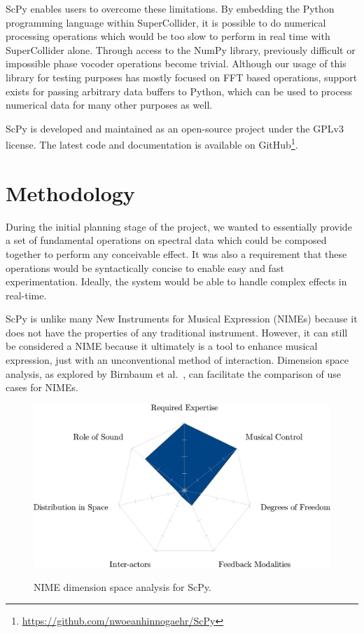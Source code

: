 \documentclass{article}
\begin{document}
ScPy enables users to overcome these limitations. By embedding the Python programming language
within SuperCollider, it is possible to do numerical processing operations which would be too slow
to perform in real time with SuperCollider alone. Through access to the NumPy library, previously
difficult or impossible phase vocoder operations become trivial. Although our usage of this library
for testing purposes has mostly focused on FFT based operations, support exists for passing
arbitrary data buffers to Python, which can be used to process numerical data for many other
purposes as well.

ScPy is developed and maintained as an open-source project under the GPLv3 license. The
latest code and documentation is available on GitHub\footnote{\url{https://github.com/nwoeanhinnogaehr/ScPy}}.

\section{Methodology}\label{sec:methodology}

During the initial planning stage of the project, we wanted to essentially provide a set of
fundamental operations on spectral data which could be composed together to perform any conceivable
effect. It was also a requirement that these operations would be syntactically concise to enable
easy and fast experimentation. Ideally, the system would be able to handle complex effects in
real-time.

ScPy is unlike many New Instruments for Musical Expression (NIMEs) because it does not have the
properties of any traditional instrument. However, it can still be considered a NIME because it
ultimately is a tool to enhance musical expression, just with an unconventional method of
interaction.  Dimension space analysis, as explored by Birnbaum et al.~\cite{birnbaum2005towards},
can facilitate the comparison of use cases for NIMEs.

\begin{figure}[h]
\caption{NIME dimension space analysis for ScPy.}
\vspace{1em}
\includegraphics[scale=0.2]{nime-plot}
\label{fig:nime}
\end{figure}
\end{document}
